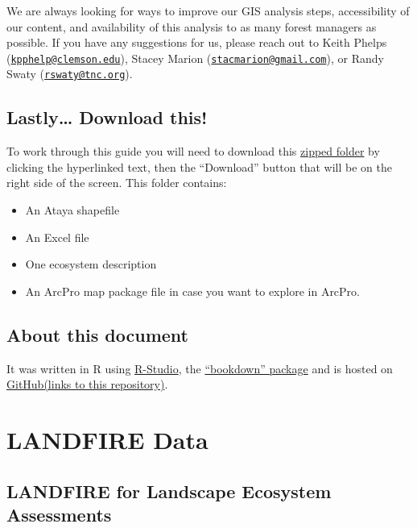 \documentclass[
]{book}
\providecommand{\tightlist}{%
  \setlength{\itemsep}{0pt}\setlength{\parskip}{0pt}}
\begin{document}
We are always looking for ways to improve our GIS analysis steps, accessibility of our content, and availability of this analysis to as many forest managers as possible. If you have any suggestions for us, please reach out to Keith Phelps (\href{mailto:kpphelp@clemson.edu}{\nolinkurl{kpphelp@clemson.edu}}), Stacey Marion (\href{mailto:stacmarion@gmail.com}{\nolinkurl{stacmarion@gmail.com}}), or Randy Swaty (\href{mailto:rswaty@tnc.org}{\nolinkurl{rswaty@tnc.org}}).

\hypertarget{lastly-download-this}{%
\section{Lastly\ldots{} Download this!}\label{lastly-download-this}}

To work through this guide you will need to download this \href{https://github.com/rswaty/landfireFSC/blob/main/toDownload.zip}{zipped folder} by clicking the hyperlinked text, then the ``Download'' button that will be on the right side of the screen. This folder contains:

\begin{itemize}
\tightlist
\item
  An Ataya shapefile
\item
  An Excel file
\item
  One ecosystem description
\item
  An ArcPro map package file in case you want to explore in ArcPro.
\end{itemize}

\hypertarget{about-this-document}{%
\section{About this document}\label{about-this-document}}

It was written in R using \href{https://rstudio.com/}{R-Studio}, the \href{https://www.bookdown.org/}{``bookdown'' package} and is hosted on \href{https://github.com/rswaty/landfireFSC}{GitHub(links to this repository)}.

\hypertarget{inputData}{%
\chapter{LANDFIRE Data}\label{inputData}}

\hypertarget{landfire-for-landscape-ecosystem-assessments}{%
\section{LANDFIRE for Landscape Ecosystem Assessments}\label{landfire-for-landscape-ecosystem-assessments}}
\end{document}
